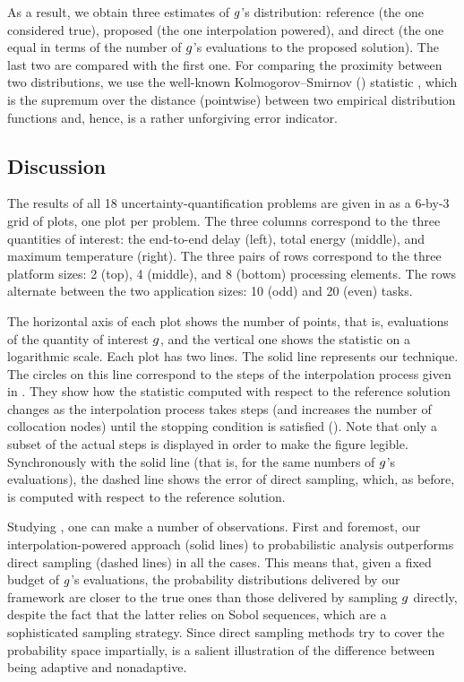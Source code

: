 As a result, we obtain three estimates of $g$'s distribution: reference (the
one considered true), proposed (the one interpolation powered), and direct (the
one equal in terms of the number of $g$'s evaluations to the proposed
solution). The last two are compared with the first one. For comparing the
proximity between two distributions, we use the well-known Kolmogorov--Smirnov
() statistic \cite{rao2009}, which is the supremum over the distance
(pointwise) between two empirical distribution functions and, hence, is a rather
unforgiving error indicator.


\subsection{Discussion}
The results of all 18 uncertainty-quantification problems are given in
 as a 6-by-3 grid of plots, one plot per problem. The three
columns correspond to the three quantities of interest: the end-to-end delay
(left), total energy (middle), and maximum temperature (right). The three pairs
of rows correspond to the three platform sizes: 2 (top), 4 (middle), and 8
(bottom) processing elements. The rows alternate between the two application
sizes: 10 (odd) and 20 (even) tasks.

The horizontal axis of each plot shows the number of points, that is,
evaluations of the quantity of interest $g$, and the vertical one shows the
 statistic on a logarithmic scale. Each plot has two lines. The solid
line represents our technique. The circles on this line correspond to the steps
of the interpolation process given in . They show how the
 statistic computed with respect to the reference solution changes as the
interpolation process takes steps (and increases the number of collocation
nodes) until the stopping condition is satisfied (). Note that
only a subset of the actual steps is displayed in order to make the figure
legible. Synchronously with the solid line (that is, for the same numbers of
$g$'s evaluations), the dashed line shows the error of direct sampling, which,
as before, is computed with respect to the reference solution.

Studying , one can make a number of observations. First and
foremost, our interpolation-powered approach (solid lines) to probabilistic
analysis outperforms direct sampling (dashed lines) in all the cases. This means
that, given a fixed budget of $g$'s evaluations, the probability distributions
delivered by our framework are closer to the true ones than those delivered by
sampling $g$ directly, despite the fact that the latter relies on Sobol
sequences, which are a sophisticated sampling strategy. Since direct sampling
methods try to cover the probability space impartially,  is a
salient illustration of the difference between being adaptive and nonadaptive.

